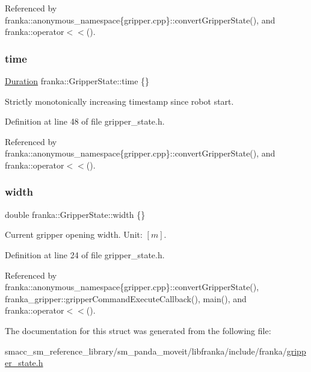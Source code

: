 Referenced by franka\+::anonymous\+\_\+namespace\{gripper.\+cpp\}\+::convert\+Gripper\+State(), and franka\+::operator$<$$<$().

\mbox{\label{structfranka_1_1GripperState_a80bf474b0e4351e2eefab62d1bd10c07}} 
\subsubsection{\texorpdfstring{time}{time}}
{\footnotesize\ttfamily \hyperlink{classfranka_1_1Duration}{Duration} franka\+::\+Gripper\+State\+::time \{\}}

Strictly monotonically increasing timestamp since robot start. 

Definition at line 48 of file gripper\+\_\+state.\+h.



Referenced by franka\+::anonymous\+\_\+namespace\{gripper.\+cpp\}\+::convert\+Gripper\+State(), and franka\+::operator$<$$<$().

\mbox{\label{structfranka_1_1GripperState_adf095f446ec39a9a48e120b209dcd6e9}} 
\subsubsection{\texorpdfstring{width}{width}}
{\footnotesize\ttfamily double franka\+::\+Gripper\+State\+::width \{\}}

Current gripper opening width. Unit\+: $[m]$. 

Definition at line 24 of file gripper\+\_\+state.\+h.



Referenced by franka\+::anonymous\+\_\+namespace\{gripper.\+cpp\}\+::convert\+Gripper\+State(), franka\+\_\+gripper\+::gripper\+Command\+Execute\+Callback(), main(), and franka\+::operator$<$$<$().



The documentation for this struct was generated from the following file\+:\begin{DoxyCompactItemize}
\item 
smacc\+\_\+sm\+\_\+reference\+\_\+library/sm\+\_\+panda\+\_\+moveit/libfranka/include/franka/\hyperlink{gripper__state_8h}{gripper\+\_\+state.\+h}\end{DoxyCompactItemize}

